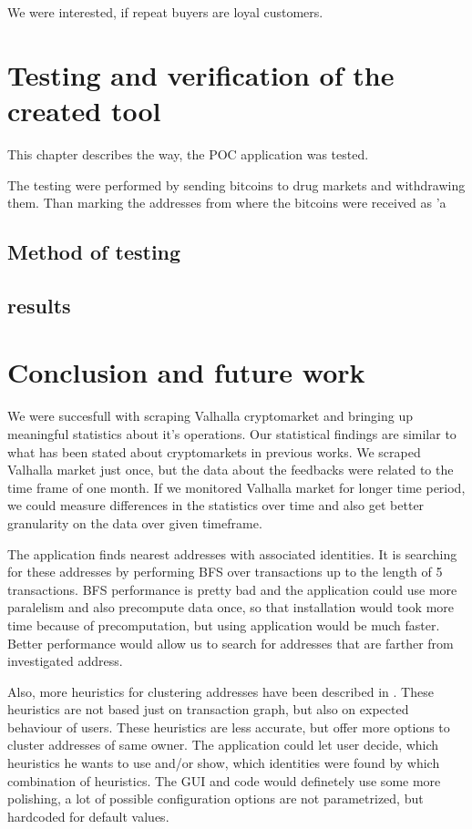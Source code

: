\documentclass[
  digital, %
  table,   %
  lof,     %
  lot,     %
  oneside
]{fithesis3}
\begin{document}
We were interested, if repeat buyers are loyal customers.


\chapter{Testing and verification of the created tool}
This chapter describes the way, the POC application was tested.

The testing were performed by sending bitcoins to drug markets and withdrawing them.
Than marking the addresses from where the bitcoins were received as 'a
\section{Method of testing}
\section{results}



\chapter{Conclusion and future work}

We were succesfull with scraping Valhalla cryptomarket and
bringing up meaningful statistics about it's operations.
Our statistical findings are similar to what has been stated about
cryptomarkets in previous works.
We scraped Valhalla market just once, but the data about the feedbacks were
related to the time frame of one month. If we monitored Valhalla market for longer time period,
we could measure differences in the statistics over time and also get better granularity
on the data over given timeframe.

The application finds nearest addresses with associated identities.
It is searching for these addresses by performing BFS over transactions up to the length of 5 transactions.
BFS performance is pretty bad and the application could use more paralelism and also precompute data once, so that
installation would took more time because of precomputation, but using application would be much faster.
Better performance would allow us to search for addresses that are farther from investigated address.

Also, more heuristics for clustering addresses have been described in 
\parencite{androulaki2013evaluating}. These heuristics are not based just on transaction graph, but also
on expected behaviour of users. These heuristics are less accurate, but 
offer more options to cluster addresses of same owner. The application could let user decide, which heuristics
he wants to use and/or show, which identities were found by which combination of heuristics.
The GUI and code would definetely use some more polishing, a lot of possible configuration options
are not parametrized, but hardcoded for default values.
\end{document}
